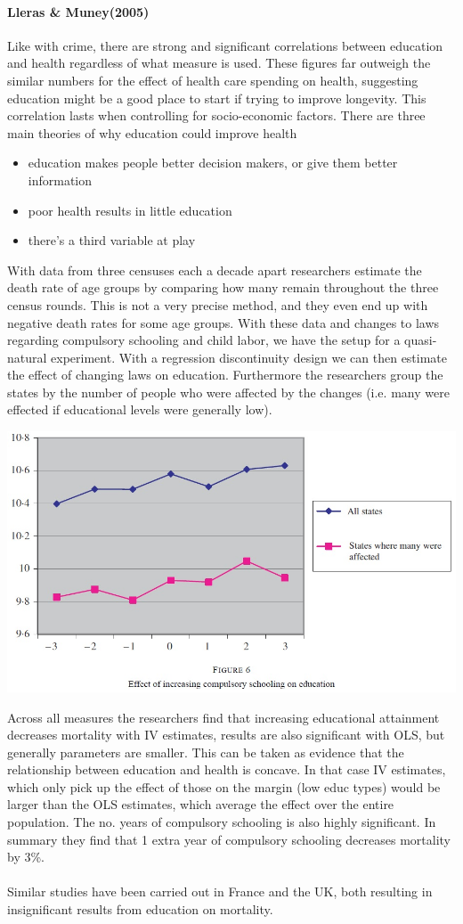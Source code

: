 \documentclass[12pt, a4paper]{article}
\begin{document}
\begin{multicols}{2}
\paragraph{Lleras \& Muney(2005)} Like with crime, there are strong and significant correlations between education and health regardless of what measure is used. These figures far outweigh the similar numbers for the effect of health care spending on health, suggesting education might be a good place to start if trying to improve longevity. This correlation lasts when controlling for socio-economic factors. There are three main theories of why education could improve health
\begin{itemize}
\item education makes people better decision makers, or give them better information
\item poor health results in little education
\item there's a third variable at play
\end{itemize}
With data from three censuses each a decade apart researchers estimate the death rate of age groups by comparing how many remain throughout the three census rounds. This is not a very precise method, and they even end up with negative death rates for some age groups. With these data and changes to laws regarding compulsory schooling and child labor, we have the setup for a quasi-natural experiment. With a regression discontinuity design we can then estimate the effect of changing laws on education. Furthermore the researchers group the states by the number of people who were affected by the changes (i.e. many were effected if educational levels were generally low).

\includegraphics[width = 0.4 \textwidth]{compsch.jpg}

Across all measures the researchers find that increasing educational attainment decreases mortality with IV estimates, results are also significant with OLS, but generally parameters are smaller. This can be taken as evidence that the relationship between education and health is concave. In that case IV estimates, which only pick up the effect of those on the margin (low educ types) would be larger than the OLS estimates, which average the effect over the entire population. The no. years of compulsory schooling is also highly significant. In summary they find that 1 extra year of compulsory schooling decreases mortality by 3\%. 
\\ \\
Similar studies have been carried out in France and the UK, both resulting in insignificant results from education on mortality. 


\end{multicols}
\end{document}
